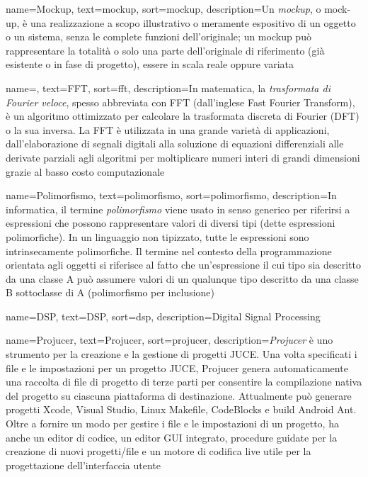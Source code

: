{
    name=Mockup,
    text=mockup,
    sort=mockup,
    description={Un \textit{mockup}, o mock-up, è una realizzazione a scopo illustrativo o meramente espositivo di un oggetto o un sistema, senza le complete funzioni dell'originale; un mockup può rappresentare la totalità o solo una parte dell'originale di riferimento (già esistente o in fase di progetto), essere in scala reale oppure variata}
}

{
    name=,
    text=FFT,
    sort=fft,
    description={In matematica, la \textit{trasformata di Fourier veloce}, spesso abbreviata con FFT (dall'inglese Fast Fourier Transform), è un algoritmo ottimizzato per calcolare la trasformata discreta di Fourier (DFT) o la sua inversa. La FFT è utilizzata in una grande varietà di applicazioni, dall'elaborazione di segnali digitali alla soluzione di equazioni differenziali alle derivate parziali agli algoritmi per moltiplicare numeri interi di grandi dimensioni grazie al basso costo computazionale}
}

{
    name=Polimorfismo,
    text=polimorfismo,
    sort=polimorfismo,
    description={In informatica, il termine \textit{polimorfismo} viene usato in senso generico per riferirsi a espressioni che possono rappresentare valori di diversi tipi (dette espressioni polimorfiche). In un linguaggio non tipizzato, tutte le espressioni sono intrinsecamente polimorfiche. Il termine nel contesto della programmazione orientata agli oggetti si riferisce al fatto che un'espressione il cui tipo sia descritto da una classe A può assumere valori di un qualunque tipo descritto da una classe B sottoclasse di A (polimorfismo per inclusione)}
}

{
    name=DSP,
    text=DSP,
    sort=dsp,
    description={Digital Signal Processing}
}

{
    name=Projucer,
    text=Projucer,
    sort=projucer,
    description={\textit{Projucer} è uno strumento per la creazione e la gestione di progetti JUCE. Una volta specificati i file e le impostazioni per un progetto JUCE, Projucer genera automaticamente una raccolta di file di progetto di terze parti per consentire la compilazione nativa del progetto su ciascuna piattaforma di destinazione. Attualmente può generare progetti Xcode, Visual Studio, Linux Makefile, CodeBlocks e build Android Ant. Oltre a fornire un modo per gestire i file e le impostazioni di un progetto, ha anche un editor di codice, un editor GUI integrato, procedure guidate per la creazione di nuovi progetti/file e un motore di codifica live utile per la progettazione dell'interfaccia utente}
}